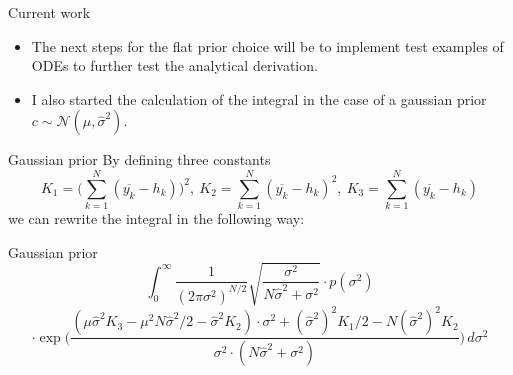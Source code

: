 \documentclass{beamer}
\newcommand{\s}{\sigma^2}
\newcommand{\sh}{\hat{\sigma}^2}
\begin{document}
	\begin{frame}{Current work}
		\begin{itemize}
			\item The next steps for the flat prior choice will be to implement 
			test examples of ODEs to further test the analytical derivation.
			\item I also started the calculation of the integral in the case of a 
			gaussian prior $c  \sim \mathcal{N}(\mu, \hat{\sigma}^2)$.
		\end{itemize}
	\end{frame}

	\begin{frame}{Gaussian prior}
		By defining three constants
		\[
			K_1 = \biggl(\sum_{k = 1}^N (\overline{y_k} - h_k) \biggr)^2, \ K_2 
			= \sum_{k = 1}^N (\overline{y_k} - h_k)^2, \ K_3 = 
			\sum_{k = 1}^N (\overline{y_k} - h_k)
		\]
		we can rewrite the integral in the following way:
	\end{frame}

	\begin{frame}{Gaussian prior}
		\[
    		\int_0^{\infty} \frac{1}{(2\pi\s)^{N/2}} \sqrt{\frac{\s}{N\sh + \s}}
    		\cdot p(\s)
		\]
		\[
   			\cdot \exp \biggl(\frac{(\mu \sh K_3 - \mu^2 N \sh /2 - \sh K_2) \cdot 
   			\s + (\sh)^2 K_1 /2 - N (\sh)^2 K_2}{\s \cdot (N\sh + \s)} \biggr)
   		 	\, d\s
		\]
	\end{frame}
\end{document}
